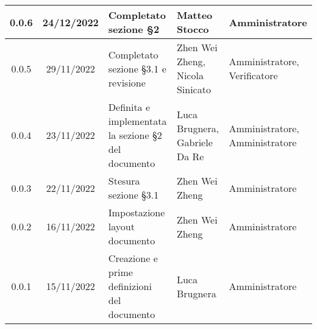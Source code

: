 \begin{center}
\begin{tabularx}{\textwidth}{| c | c | X | X | X |}
 \hline
 0.0.6 & 24/12/2022 & Completato sezione §2 & Matteo Stocco & Amministratore\\
 \hline
 0.0.5 & 29/11/2022 & Completato sezione §3.1 e revisione & Zhen Wei Zheng, Nicola Sinicato & Amministratore, Verificatore\\
 \hline
 0.0.4 & 23/11/2022 &  Definita e implementata la sezione §2 del documento & Luca Brugnera, Gabriele Da Re & Amministratore, Amministratore\\
 \hline
 0.0.3 & 22/11/2022 & Stesura sezione §3.1 & Zhen Wei Zheng & Amministratore\\
 \hline
 0.0.2 & 16/11/2022 & Impostazione layout documento & Zhen Wei Zheng & Amministratore\\
 \hline
 0.0.1 & 15/11/2022 & Creazione e prime definizioni del documento & Luca Brugnera & Amministratore\\
 \hline
\end{tabularx}
\end{center}
